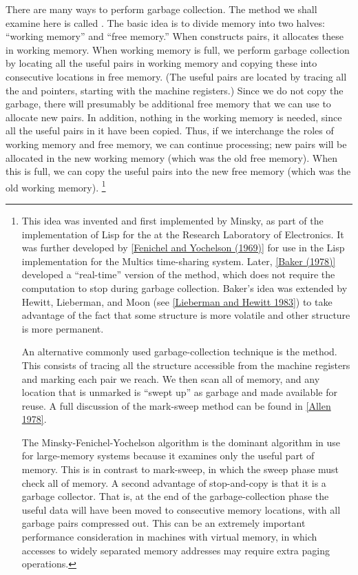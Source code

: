 There are many ways to perform garbage collection.
The method we shall examine here is called .
The basic idea is to divide memory into two halves:
“working memory” and  “free memory.”
When  constructs pairs, it allocates these in working memory.
When working memory is full, we perform garbage collection by locating all the useful pairs in working memory and copying these into consecutive locations in free memory.
(The useful pairs are located by tracing all the  and  pointers, starting with the machine registers.)
Since we do not copy the garbage, there will presumably be additional free memory that we can use to allocate new pairs.
In addition, nothing in the working memory is needed, since all the useful pairs in it have been copied.
Thus, if we interchange the roles of working memory and free memory, we can continue processing;
new pairs will be allocated in the new working memory (which was the old free memory).
When this is full, we can copy the useful pairs into the new free memory (which was the old working memory).%
\footnote{
	This idea was invented and first implemented by Minsky, as part of the implementation of Lisp for the  at the  Research Laboratory of Electronics.
	It was further developed by \cref{Fenichel and Yochelson (1969)} for use in the Lisp implementation for the Multics time-sharing system.
	Later, \cref{Baker (1978)} developed a “real-time” version of the method, which does not require the computation to stop during garbage collection.
	Baker’s idea was extended by Hewitt, Lieberman, and Moon (see \cref{Lieberman and Hewitt 1983}) to take advantage of the fact that some structure is more volatile and other structure is more permanent.

	An alternative commonly used garbage-collection technique is the  method.
	This consists of tracing all the structure accessible from the machine registers and marking each pair we reach.
	We then scan all of memory, and any location that is unmarked is “swept up” as garbage and made available for reuse.
	A full discussion of the mark-sweep method can be found in \cref{Allen 1978}.

	The Minsky-Fenichel-Yochelson algorithm is the dominant algorithm in use for large-memory systems because it examines only the useful part of memory.
	This is in contrast to mark-sweep, in which the sweep phase must check all of memory.
	A second advantage of stop-and-copy is that it is a  garbage collector.
	That is, at the end of the garbage-collection phase the useful data will have been moved to consecutive memory locations, with all garbage pairs compressed out.
	This can be an extremely important performance consideration in machines with virtual memory, in which accesses to widely separated memory addresses may require extra paging operations.
}



